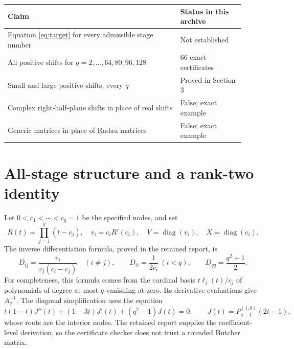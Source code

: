 \documentclass[11pt,letterpaper]{article}
\begin{document}
\begin{center}
\begin{tabular}{@{}p{0.67\linewidth}p{0.25\linewidth}@{}}
\toprule
Claim & Status in this archive\\\midrule
Equation \eqref{eq:target} for every admissible stage number & Not established\\
All positive shifts for $q=2,\ldots,64,80,96,128$ & 66 exact certificates\\
Small and large positive shifts, every $q$ & Proved in Section 3\\
Complex right-half-plane shifts in place of real shifts & False; exact example\\
Generic matrices in place of Radau matrices & False; exact example\\\bottomrule
\end{tabular}
\end{center}

\newpage
\section{All-stage structure and a rank-two identity}
Let $0<c_1<\cdots<c_q=1$ be the specified nodes, and set
\[
 R(t)=\prod_{j=1}^q(t-c_j),\quad v_i=c_iR'(c_i),\quad
 V=\operatorname{diag}(v_i),\quad X=\operatorname{diag}(c_i).
\]
The inverse differentiation formula, proved in the retained report, is
\begin{equation}\label{eq:D}
 D_{ij}=\frac{v_i}{v_j(c_i-c_j)}\quad(i\ne j),\qquad
 D_{ii}=\frac1{2c_i}\ (i<q),\qquad D_{qq}=\frac{q^2+1}{2}.
\end{equation}
For completeness, this formula comes from the cardinal basis
$t\ell_j(t)/c_j$ of polynomials of degree at most $q$ vanishing at zero.
Its derivative evaluations give $A_q^{-1}$. The diagonal simplification
uses the equation
\[
 t(1-t)J''(t)+(1-3t)J'(t)+(q^2-1)J(t)=0,
 \qquad J(t)=P_{q-1}^{(1,0)}(2t-1),
\]
whose roots are the interior nodes. The retained report supplies the
coefficient-level derivation, so the certificate checker does not trust a
rounded Butcher matrix.
\end{document}
